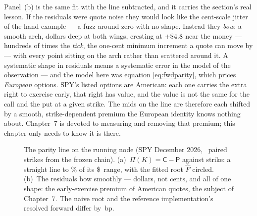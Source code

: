 Panel~(b) is the same fit with the line subtracted, and it carries the
section's real lesson.  If the residuals were quote noise they would
look like the cent-scale jitter of the hand example --- a fuzz around
zero with no shape.  Instead they \emph{bow}: a smooth arch, dollars deep at both wings,
cresting at $+\$4.8$ near the money ---
hundreds of times the \emph{tick}, the one-cent minimum increment a
quote can move by --- with every point sitting on the arch rather
than scattered around it.  A systematic shape in residuals means a
systematic error in the model of the observation --- and the model
here was equation \eqref{eq:fwdparity}, which prices \emph{European}
options.  SPY's listed options are American: each one carries the
extra right to exercise early, that right has value, and the value is
not the same for the call and the put at a given strike.  The mids on
the line are therefore each shifted by a smooth, strike-dependent
premium the European identity knows nothing about.  Chapter~7 is
devoted to measuring and removing that premium; this chapter only
needs to know it is there.

\begin{figure}[htbp]
\centering
{}
\caption{The parity line on the running node (SPY December 2026,
\MacFwdLineNPairs\ paired strikes from the frozen chain).
(a)~$\Pi(K)=\mathsf{C}-\mathsf{P}$ against strike: a straight line to
\MacFwdLineStraightPct\% of its \$\MacFwdLineSpanDollars\ range, with
the fitted root $\hat F$ circled.  (b)~The residuals bow smoothly ---
dollars, not cents, and all of one shape: the early-exercise premium
of American quotes, the subject of Chapter~7.  The naive root and the
reference implementation's resolved forward differ by
\MacFwdLineGapBp\,bp.}
\label{fig:fwdline}
\end{figure}

